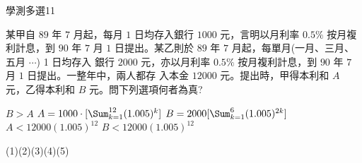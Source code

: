     \begin{QUESTION}
        \begin{ExamInfo}{91}{學測}{多選}{11}
        \end{ExamInfo}
        \begin{ExamAnsRateInfo}{16}{30}{12}{6}
        \end{ExamAnsRateInfo}
        \begin{QBODY}
            某甲自 $89$ 年 $7$ 月起，每月 $1$ 日均存入銀行 $1000$ 元，言明以月利率 $0.5\%$ 按月複利計息，到 $90$ 年 $7$ 月 $1$ 日提出。某乙則於 $89$ 年 $7$ 月起，每單月(一月、三月、五月 $\cdots$) 1 日均存入 銀行 $2000$ 元，亦以月利率 $0.5\%$ 按月複利計息，到 $90$ 年 $7$ 月 $1$ 日提出。一整年中，兩人都存 入本金 $12000$ 元。提出時，甲得本利和 $A$ 元，乙得本利和 $B$ 元。問下列選項何者為真? 
            \begin{QOPS} 
                \QOP $B>A$ 
                \QOP $A= 1000\cdot [\Sum_{k=1}^{12} (1.005)^k ]$ 
                \QOP $B= 2000 [\Sum_{k=1}^{6} (1.005)^{2k}] $ 
                \QOP $A< 12000 (1.005)^{12}$  
                \QOP $B< 12000 (1.005)^{12}$
            \end{QOPS}
        \end{QBODY}
        \begin{QFROMS}
        \end{QFROMS}
        \begin{QTAGS}\end{QTAGS}
        \begin{QANS}
            (1)(2)(3)(4)(5)
        \end{QANS}
        \begin{QSOLLIST}
        \end{QSOLLIST}
        \begin{QEMPTYSPACE}
        \end{QEMPTYSPACE}
    \end{QUESTION}
